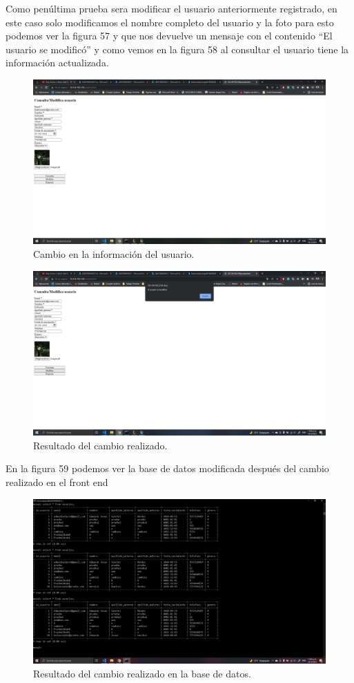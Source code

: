 \documentclass[11pt]{article}
\begin{document}
		Como penúltima prueba sera modificar el usuario anteriormente registrado, en este caso solo modificamos el nombre completo del usuario y la foto para esto podemos ver la figura 57 y que nos devuelve un mensaje con el contenido ``El usuario se modificó'' y como vemos en la figura 58 al consultar el usuario tiene la información actualizada.
		\begin{figure}[H]
			\centering
			\includegraphics[scale=0.34]{resources/prueba5.1.png}
			\caption{Cambio en la información del usuario.}\label{fig:picture}
		\end{figure}
		\begin{figure}[H]
			\centering
			\includegraphics[scale=0.34]{resources/prueba5.2.png}
			\caption{Resultado del cambio realizado.}\label{fig:picture}
		\end{figure}
		En la figura 59 podemos ver la base de datos modificada después del cambio realizado en el front end
		\begin{figure}[H]
			\centering
			\includegraphics[scale=0.34]{resources/prueba5.4.png}
			\caption{Resultado del cambio realizado en la base de datos.}\label{fig:picture}
		\end{figure}
\end{document}
